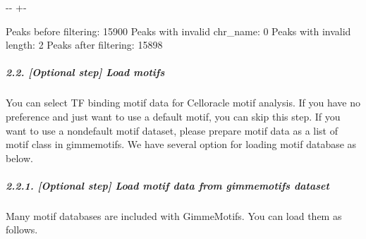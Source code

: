 \documentclass[letterpaper,10pt,english]{sphinxmanual}
\newlength\nbsphinxcodecellspacing
\begin{document}
{

\kern-\sphinxverbatimsmallskipamount\kern-\baselineskip
\kern+\FrameHeightAdjust\kern-\fboxrule
\vspace{\nbsphinxcodecellspacing}

\begin{sphinxVerbatim}[commandchars=\\\{\}]
Peaks before filtering:  15900
Peaks with invalid chr\_name:  0
Peaks with invalid length:  2
Peaks after filtering:  15898
\end{sphinxVerbatim}
}


\subparagraph{2.2. {[}Optional step{]} Load motifs}
\label{\detokenize{notebooks/02_motif_scan/02_atac_peaks_to_TFinfo_with_celloracle_20200801:2.2.-_Optional-step_-Load-motifs}}
You can select TF binding motif data for Celloracle motif analysis. If you have no preference and just want to use a default motif, you can skip this step. If you want to use a non\sphinxhyphen{}default motif dataset, please prepare motif data as a list of motif class in gimmemotifs. We have several option for loading motif database as below.


\subparagraph{2.2.1. {[}Optional step{]} Load motif data from gimmemotifs dataset}
\label{\detokenize{notebooks/02_motif_scan/02_atac_peaks_to_TFinfo_with_celloracle_20200801:2.2.1.-_Optional-step_-Load-motif-data-from-gimmemotifs-dataset}}
Many motif databases are included with GimmeMotifs.  You can load them as follows.

{
\begin{sphinxVerbatim}[commandchars=\\\{\}]
\llap{\color{nbsphinxin}[9]:\,\hspace{\fboxrule}\hspace{\fboxsep}}

  
   
  
  

  \PYG{p}{[}      \PYG{p}{]}
\end{sphinxVerbatim}
}
\end{document}
